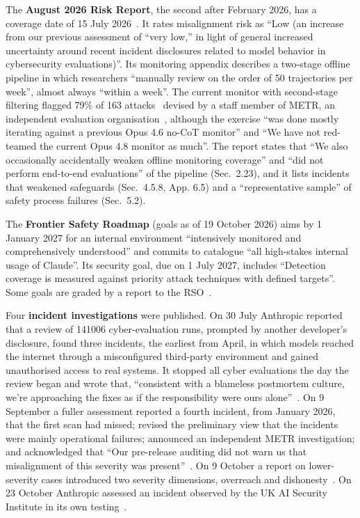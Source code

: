 \documentclass[11pt]{article}
\begin{document}
The \textbf{August 2026 Risk Report}, the second after February 2026, has a coverage date of 15 July 2026~\cite{anthropic2026rsppage,anthropic2026riskreport}. It rates misalignment risk as ``Low (an increase from our previous assessment of ``very low,'' in light of general increased uncertainty around recent incident disclosures related to model behavior in cybersecurity evaluations)''. Its monitoring appendix describes a two-stage offline pipeline in which researchers ``manually review on the order of 50 trajectories per week'', almost always ``within a week''. The current monitor with second-stage filtering flagged 79\% of 163 attacks~\cite[Sec.~2.23.1.2]{anthropic2026riskreport} devised by a staff member of METR, an independent evaluation organisation~\cite{metr2026frr}, although the exercise ``was done mostly iterating against a previous Opus 4.6 no-CoT monitor'' and ``We have not red-teamed the current Opus 4.8 monitor as much''. The report states that ``We also occasionally accidentally weaken offline monitoring coverage'' and ``did not perform end-to-end evaluations'' of the pipeline (Sec.~2.23), and it lists incidents that weakened safeguards (Sec.~4.5.8, App. 6.5) and a ``representative sample'' of safety process failures (Sec.~5.2).

The \textbf{Frontier Safety Roadmap} (goals as of 19 October 2026) aims by 1 January 2027 for an internal environment ``intensively monitored and comprehensively understood'' and commits to catalogue ``all high-stakes internal usage of Claude''. Its security goal, due on 1 July 2027, includes ``Detection coverage is measured against priority attack techniques with defined targets''. Some goals are graded by a report to the RSO~\cite{anthropic2026roadmap}.

Four \textbf{incident investigations} were published. On 30 July Anthropic reported that a review of \num{141006} cyber-evaluation runs, prompted by another developer's disclosure, found three incidents, the earliest from April, in which models reached the internet through a misconfigured third-party environment and gained unauthorised access to real systems. It stopped all cyber evaluations the day the review began and wrote that, ``consistent with a blameless postmortem culture, we're approaching the fixes as if the responsibility were ours alone''~\cite{anthropic2026threeincidents}. On 9 September a fuller assessment reported a fourth incident, from January 2026, that the first scan had missed; revised the preliminary view that the incidents were mainly operational failures; announced an independent METR investigation; and acknowledged that ``Our pre-release auditing did not warn us that misalignment of this severity was present''~\cite{anthropic2026cyberassessment}. On 9 October a report on lower-severity cases introduced two severity dimensions, overreach and dishonesty~\cite{anthropic2026unintended}. On 23 October Anthropic assessed an incident observed by the UK AI Security Institute in its own testing~\cite{anthropic2026aisi,aisi2026incident}.
\end{document}
